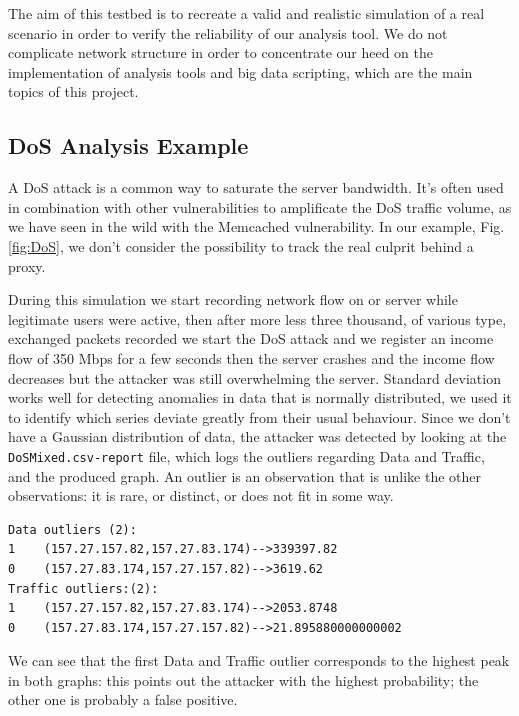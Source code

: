The aim of this testbed is to recreate a valid and realistic simulation of a real scenario in order to verify the reliability of our analysis tool. 
We do not complicate network structure in order to concentrate our heed on the implementation of analysis tools and big data scripting, which are the main topics of this project.
  
\subsection{DoS Analysis Example}
A DoS attack is a common way to saturate the server bandwidth. It's often used in combination with other vulnerabilities to amplificate the DoS traffic volume, as we have seen in the wild with the Memcached vulnerability\cite{memcached_vulnerability}. 
In our example, Fig. \ref{fig:DoS}, we don't consider the possibility to track the real culprit behind a proxy.

During this simulation we start recording network flow on or server while legitimate users were active, then after more less three thousand, of various type, exchanged packets recorded we start the DoS attack and we register an income flow of 350 Mbps for a few seconds then the server crashes and the income flow decreases but the attacker was still overwhelming the server.
Standard deviation works well for detecting anomalies in data that is normally distributed, we used it to identify which series deviate greatly from their usual behaviour.
Since we don't have a Gaussian distribution of data, the attacker was detected by looking at the \texttt{DoSMixed.csv-report} file, which logs the outliers regarding Data and Traffic, and the produced graph. An outlier is an observation that is unlike the other observations: it is rare, or distinct, or does not fit in some way\cite{outliers}.

\begin{lstlisting}[columns=flexible, breaklines=true, frame=tb, caption={\textit{DoSMixed.csv-report} file}, label={lst:DoSMixed.csv-report}]
Data outliers (2):
1    (157.27.157.82,157.27.83.174)-->339397.82
0    (157.27.83.174,157.27.157.82)-->3619.62
Traffic outliers:(2):
1    (157.27.157.82,157.27.83.174)-->2053.8748
0    (157.27.83.174,157.27.157.82)-->21.895880000000002
\end{lstlisting}

We can see that the first Data and Traffic outlier corresponds to the highest peak in both graphs: this points out the attacker with the highest probability; the other one is probably a false positive.

